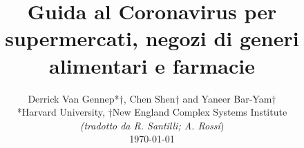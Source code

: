 \documentclass[onecolumn,journal]{IEEEtran}
\begin{document}
\title{\color{Brown} Guida al Coronavirus per supermercati, negozi di generi alimentari e farmacie
 \\
\vspace{-0.35ex}}
\author{Derrick Van Gennep*†, Chen Shen† and Yaneer Bar-Yam† \\ *Harvard University, †New England Complex Systems Institute \\
\vspace{+0.35ex}
\small{\textit{(tradotto da R. Santilli; A. Rossi})}\\
 \today
  \vspace{-14ex} \\


\bigskip
\bigskip

\textbf{}
 }

\maketitle


\flushbottom %



\thispagestyle{empty} %




\renewcommand{\thefootnote}{\fnsymbol{footnote}}
\end{document}
